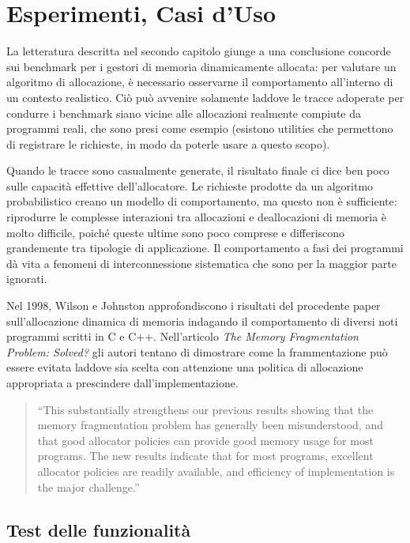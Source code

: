\chapter{Esperimenti, Casi d’Uso}

La letteratura descritta nel secondo capitolo giunge a una conclusione concorde sui benchmark per i gestori di memoria dinamicamente allocata: per valutare un algoritmo di allocazione, è necessario osservarne il comportamento all’interno di un contesto realistico. Ciò può avvenire solamente laddove le tracce adoperate per condurre i benchmark siano vicine alle allocazioni realmente compiute da programmi reali, che sono presi come esempio (esistono utilities che permettono di registrare le richieste, in modo da poterle usare a questo scopo).

Quando le tracce sono casualmente generate, il risultato finale ci dice ben poco sulle capacità effettive dell’allocatore. Le richieste prodotte da un algoritmo probabilistico creano un modello di comportamento, ma questo non è sufficiente: riprodurre le complesse interazioni tra allocazioni e deallocazioni di memoria è molto difficile, poiché queste ultime sono poco comprese e differiscono grandemente tra tipologie di applicazione. Il comportamento a fasi dei programmi dà vita a fenomeni di interconnessione sistematica che sono per la maggior parte ignorati.

Nel 1998, Wilson e Johnston approfondiscono i risultati del procedente paper sull’allocazione dinamica di memoria indagando il comportamento di diversi noti programmi scritti in C e C++. Nell’articolo \emph{The Memory Fragmentation Problem: Solved?} gli autori tentano di dimostrare come la frammentazione può essere evitata laddove sia scelta con attenzione una politica di allocazione appropriata a prescindere dall’implementazione.

\begin{quote}
``This substantially strengthens our previous results showing that the memory fragmentation problem has generally been misunderstood, and that good allocator policies can provide good memory usage for most programs. The new results indicate that for most programs, excellent allocator policies are readily available, and efficiency of implementation is the major challenge.''
\end{quote}

\section{Test delle funzionalità}

